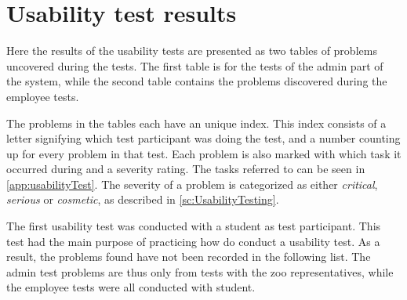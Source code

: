 \chapter{Usability test results}\label{app:UsabilityProblems}
Here the results of the usability tests are presented as two tables of problems uncovered during the tests. The first table is for the tests of the admin part of the system, while the second table contains the problems discovered during the employee tests.
\par
The problems in the tables each have an unique index. This index consists of a letter signifying which test participant was doing the test, and a number counting up for every problem in that test. Each problem is also marked with which task it occurred during and a severity rating. The tasks referred to can be seen in \autoref{app:usabilityTest}. The severity of a problem is categorized as either \textit{critical}, \textit{serious} or \textit{cosmetic}, as described in \autoref{sc:UsabilityTesting}. 
\par
The first usability test was conducted with a student as test participant. This test had the main purpose of practicing how do conduct a usability test. As a result, the problems found have not been recorded in the following list. The admin test problems are thus only from tests with the zoo representatives, while the employee tests were all conducted with student.

